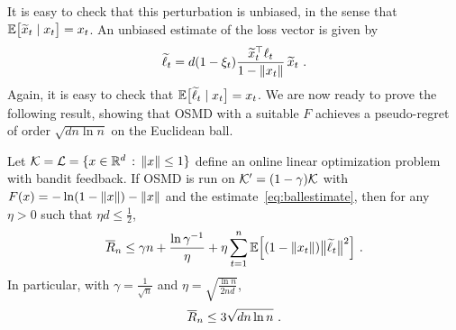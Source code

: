 It is easy to check that this perturbation is unbiased, in the sense that
$\mathbb{E}\bigl[\widetilde{x}_t \mid x_t\bigr] = x_t$.
An unbiased estimate of the loss vector is given by
\begin{equation} \label{eq:ballestimate}
\widetilde{\ell}_t = d(1 - \xi_t) \frac{\widetilde{x}_t^{\top}\ell_t}{1- \left\|{x_t}\right\|}\,\widetilde{x}_t~.
\end{equation}
Again, it is easy to check that
$\mathbb{E}\bigl[\widetilde{\ell}_t \mid x_t\bigr] = x_t$.
We are now ready to prove the following result, showing that OSMD with a suitable $F$ achieves a pseudo-regret of order $\sqrt{dn\ln n}$ on the Euclidean ball.
\begin{theorem} \label{th:ball}
Let $\mathcal{K} = \mathcal{L} = \{x \in \mathbb{R}^d \,:\, \left\|{x}\right\| \leq 1 \}$ define an online linear optimization problem with bandit feedback. If OSMD is run on $\mathcal{K}' = (1-\gamma)\mathcal{K}$ with $F(x) = - \ln(1 - \left\|{x}\right\|) - \left\|{x}\right\|$ and the estimate~\eqref{eq:ballestimate}, then for any $\eta > 0$ such that $\eta d \leq \frac12$,
\begin{equation} \label{eq:ballregret1}
\overline{R}_n \leq \gamma n + \frac{\ln \gamma^{-1}}{\eta} + \eta \sum_{t=1}^n \mathbb{E}\Bigl[(1 - \left\|{x_t}\right\|)\big\|\widetilde{\ell}_t\big\|^2\Bigr]~.
\end{equation}
In particular, with $\gamma = \frac{1}{\sqrt{n}}$ and $\eta= \sqrt{\frac{\ln n}{2 n d}}$,
\begin{equation} \label{eq:ballregret2}
\overline{R}_n \leq  3 \sqrt{d n \ln n}~.
\end{equation}
\end{theorem}
%
